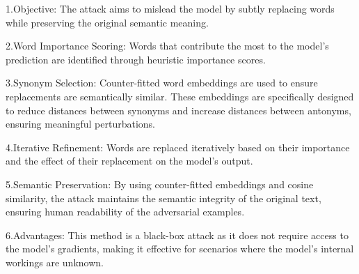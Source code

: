 1.Objective: The attack aims to mislead the model by subtly replacing words while preserving the original semantic meaning.  

2.Word Importance Scoring: Words that contribute the most to the model's prediction are identified through heuristic importance scores.  

3.Synonym Selection: Counter-fitted word embeddings are used to ensure replacements are semantically similar. These embeddings are specifically designed to reduce distances between synonyms and increase distances between antonyms, ensuring meaningful perturbations.  

4.Iterative Refinement: Words are replaced iteratively based on their importance and the effect of their replacement on the model's output.  

5.Semantic Preservation: By using counter-fitted embeddings and cosine similarity, the attack maintains the semantic integrity of the original text, ensuring human readability of the adversarial examples.  

6.Advantages: This method is a black-box attack as it does not require access to the model’s gradients, making it effective for scenarios where the model's internal workings are unknown.